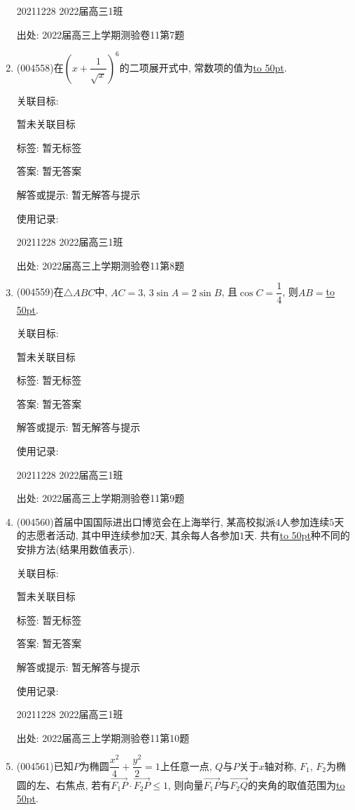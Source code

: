 \documentclass[10pt,a4paper]{article}
\newcommand{\blank}[1]{\underline{\hbox to #1pt{}}}
\begin{document}
\begin{enumerate}[1.]
20211228	2022届高三1班	


出处: 2022届高三上学期测验卷11第7题
\item { (004558)}在$(x+\dfrac{1}{\sqrt{x}})^6$的二项展开式中, 常数项的值为\blank{50}.


关联目标:

暂未关联目标



标签: 暂无标签

答案: 暂无答案

解答或提示: 暂无解答与提示

使用记录:

20211228	2022届高三1班	


出处: 2022届高三上学期测验卷11第8题
\item { (004559)}在$\triangle ABC$中, $AC=3$, $3\sin A=2\sin B$, 且$\cos C=\dfrac 14$, 则$AB=$\blank{50}.


关联目标:

暂未关联目标



标签: 暂无标签

答案: 暂无答案

解答或提示: 暂无解答与提示

使用记录:

20211228	2022届高三1班	


出处: 2022届高三上学期测验卷11第9题
\item { (004560)}首届中国国际进出口博览会在上海举行, 某高校拟派$4$人参加连续$5$天的志愿者活动, 其中甲连续参加$2$天, 其余每人各参加$1$天. 共有\blank{50}种不同的安排方法(结果用数值表示).


关联目标:

暂未关联目标



标签: 暂无标签

答案: 暂无答案

解答或提示: 暂无解答与提示

使用记录:

20211228	2022届高三1班	


出处: 2022届高三上学期测验卷11第10题
\item { (004561)}已知$P$为椭圆$\dfrac{x^2}{4}+\dfrac{y^2}2=1$上任意一点, $Q$与$P$关于$x$轴对称, $F_1$, $F_2$为椭圆的左、右焦点, 若有$\overrightarrow{F_1P}\cdot \overrightarrow{F_2P}\le 1$, 则向量$\overrightarrow{F_1P}$与$\overrightarrow{F_2Q}$的夹角的取值范围为\blank{50}.



\end{enumerate}
\end{document}
